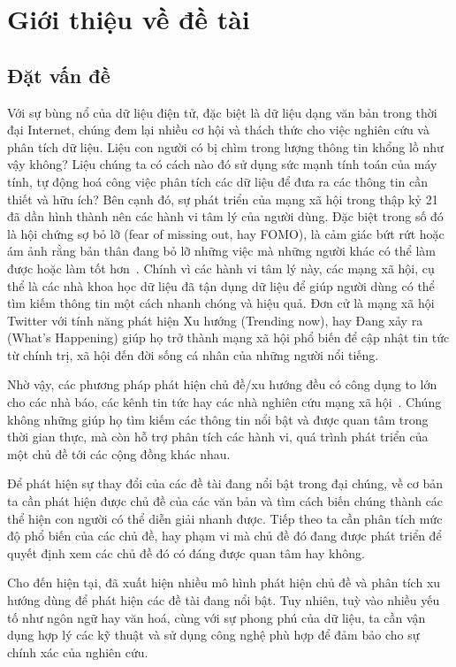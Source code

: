 \chapter{Giới thiệu về đề tài}
\label{sec:introduction}

\section{Đặt vấn đề}
Với sự bùng nổ của dữ liệu điện tử, đặc biệt là dữ liệu dạng văn bản trong thời đại Internet, chúng đem lại nhiều cơ hội và thách thức cho việc nghiên cứu và phân tích dữ liệu. Liệu con người có bị chìm trong lượng thông tin khổng lồ như vậy không? Liệu chúng ta có cách nào đó sử dụng sức mạnh tính toán của máy tính, tự động hoá công việc phân tích các dữ liệu để đưa ra các thông tin cần thiết và hữu ích? Bên cạnh đó, sự phát triển của mạng xã hội trong thập kỷ 21 đã dần hình thành nên các hành vi tâm lý của người dùng. Đặc biệt trong số đó là hội chứng sợ bỏ lỡ (fear of missing out, hay FOMO), là cảm giác bứt rứt hoặc ám ảnh rằng bản thân đang bỏ lỡ những việc mà những người khác có thể làm được hoặc làm tốt hơn~\cite{jwtintelligenceFearMissingOut2015}. Chính vì các hành vi tâm lý này, các mạng xã hội, cụ thể là các nhà khoa học dữ liệu đã tận dụng dữ liệu để giúp người dùng có thể tìm kiếm thông tin một cách nhanh chóng và hiệu quả. Đơn cử là mạng xã hội Twitter với tính năng phát hiện Xu hướng (Trending now), hay Đang xảy ra (What's Happening) giúp họ trở thành mạng xã hội phổ biến để cập nhật tin tức từ chính trị, xã hội đến đời sống cá nhân của những người nổi tiếng.

Nhờ vậy, các phương pháp phát hiện chủ đề/xu hướng đều có công dụng to lớn cho các nhà báo, các kênh tin tức hay các nhà nghiên cứu mạng xã hội~\cite{madaniRealtimeTrendingTopics2015}. Chúng không những giúp họ tìm kiếm các thông tin nổi bật và được quan tâm trong thời gian thực, mà còn hỗ trợ phân tích các hành vi, quá trình phát triển của một chủ đề tới các cộng đồng khác nhau.

Để phát hiện sự thay đổi của các đề tài đang nổi bật trong đại chúng, về cơ bản ta cần phát hiện được chủ đề của các văn bản và tìm cách biến chúng thành các thể hiện con người có thể diễn giải nhanh được. Tiếp theo ta cần phân tích mức độ phổ biến của các chủ đề, hay phạm vi mà chủ đề đó đang được phát triển để quyết định xem các chủ đề đó có đáng được quan tâm hay không.

Cho đến hiện tại, đã xuất hiện nhiều mô hình phát hiện chủ đề và phân tích xu hướng dùng để phát hiện các đề tài đang nổi bật. Tuy nhiên, tuỳ vào nhiều yếu tố như ngôn ngữ hay văn hoá, cùng với sự phong phú của dữ liệu, ta cần vận dụng hợp lý các kỹ thuật và sử dụng công nghệ phù hợp để đảm bảo cho sự chính xác của nghiên cứu.

